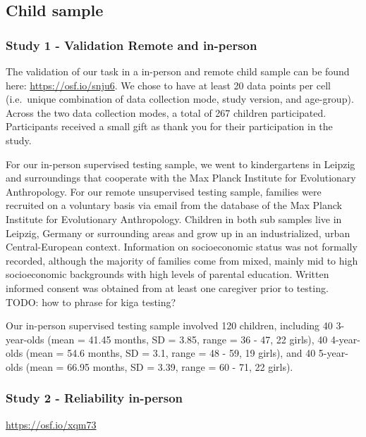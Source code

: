 \documentclass[
  english,
  man,floatsintext]{apa6}
\begin{document}
\hypertarget{child-sample}{%
\subsection{Child sample}\label{child-sample}}

\hypertarget{study-1---validation-remote-and-in-person}{%
\subsubsection{Study 1 - Validation Remote and in-person}\label{study-1---validation-remote-and-in-person}}

The validation of our task in a in-person and remote child sample can be found here: \url{https://osf.io/snju6}.
We chose to have at least 20 data points per cell (i.e.~unique combination of data collection mode, study version, and age-group). Across the two data collection modes, a total of 267 children participated. Participants received a small gift as thank you for their participation in the study.

For our in-person supervised testing sample, we went to kindergartens in Leipzig and surroundings that cooperate with the Max Planck Institute for Evolutionary Anthropology. For our remote unsupervised testing sample, families were recruited on a voluntary basis via email from the database of the Max Planck Institute for Evolutionary Anthropology. Children in both sub samples live in Leipzig, Germany or surrounding areas and grow up in an industrialized, urban Central-European context. Information on socioeconomic status was not formally recorded, although the majority of families come from mixed, mainly mid to high socioeconomic backgrounds with high levels of parental education.
Written informed consent was obtained from at least one caregiver prior to testing.
TODO: how to phrase for kiga testing?

Our in-person supervised testing sample involved 120 children, including 40 3-year-olds (mean = 41.45 months, SD = 3.85, range = 36 - 47, 22 girls), 40 4-year-olds (mean = 54.6 months, SD = 3.1, range = 48 - 59, 19 girls), and 40 5-year-olds (mean = 66.95 months, SD = 3.39, range = 60 - 71, 22 girls).

\hypertarget{study-2---reliability-in-person}{%
\subsubsection{Study 2 - Reliability in-person}\label{study-2---reliability-in-person}}

\url{https://osf.io/xqm73}
\end{document}
